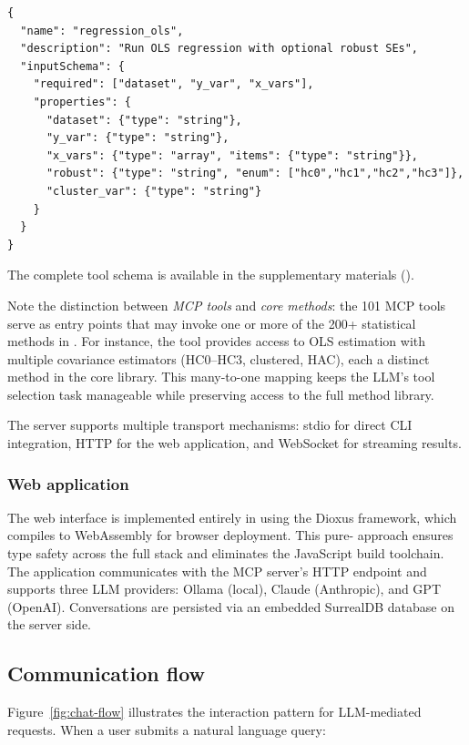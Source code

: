 \begin{verbatim}
{
  "name": "regression_ols",
  "description": "Run OLS regression with optional robust SEs",
  "inputSchema": {
    "required": ["dataset", "y_var", "x_vars"],
    "properties": {
      "dataset": {"type": "string"},
      "y_var": {"type": "string"},
      "x_vars": {"type": "array", "items": {"type": "string"}},
      "robust": {"type": "string", "enum": ["hc0","hc1","hc2","hc3"]},
      "cluster_var": {"type": "string"}
    }
  }
}
\end{verbatim}

\noindent The complete tool schema is available in the supplementary
materials ().

Note the distinction between \emph{MCP tools} and \emph{core methods}: the
101 MCP tools serve as entry points that may invoke one or more of the 200+
statistical methods in . For instance, the
 tool provides access to OLS estimation with multiple
covariance estimators (HC0--HC3, clustered, HAC), each a distinct method
in the core library. This many-to-one mapping keeps the LLM's tool selection
task manageable while preserving access to the full method library.

The server supports multiple transport mechanisms: stdio for direct CLI
integration, HTTP for the web application, and WebSocket for streaming results.

\subsubsection{Web application}

The web interface is implemented entirely in  using the
Dioxus framework, which compiles to WebAssembly for browser deployment.
This pure- approach ensures type safety across the full
stack and eliminates the JavaScript build toolchain. The application
communicates with the MCP server's HTTP endpoint and supports three
LLM providers: Ollama (local), Claude (Anthropic), and GPT (OpenAI).
Conversations are persisted via an embedded SurrealDB database on the
server side.

\subsection{Communication flow}

Figure~\ref{fig:chat-flow} illustrates the interaction pattern for
LLM-mediated requests. When a user submits a natural language query:

